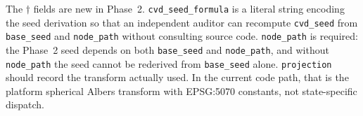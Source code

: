 The $\dagger$ fields are new in Phase~2.
\texttt{cvd\_seed\_formula} is a literal string encoding the seed derivation
so that an independent auditor can recompute \texttt{cvd\_seed} from
\texttt{base\_seed} and \texttt{node\_path} without consulting source code.
\texttt{node\_path} is required: the Phase~2 seed depends on both \texttt{base\_seed}
and \texttt{node\_path}, and without \texttt{node\_path} the seed cannot be
rederived from \texttt{base\_seed} alone.
\texttt{projection} should record the transform actually used. In the current
code path, that is the platform spherical Albers transform with EPSG:5070
constants, not state-specific dispatch.
